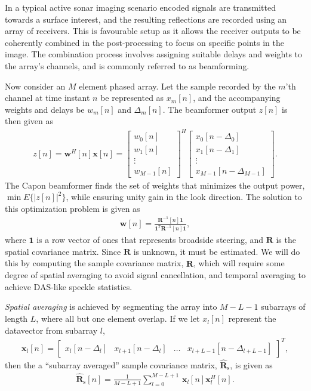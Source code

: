 \documentclass[10pt,a4paper]{article}
\newcommand\bmat[1]{\begin{bmatrix}#1\end{bmatrix}}
\newcommand\sumb[2]{\sum\limits_{#1}^{#2}\,}
\newcommand\T{^{\scriptscriptstyle T}}
\renewcommand\H{^{\scriptscriptstyle H}}
\renewcommand\vec[1]{\boldsymbol{#1}}
\newcommand\mat[1]{\boldsymbol{#1}}
\newcommand\1{\vec 1}
\newcommand*\w{\vec w}
\newcommand*\x{\vec x}
\newcommand*\R{\mat R}
\newcommand*\Ri{\R^{-1}}
\newcommand*\eR{\mat{\hat R}}
\renewcommand\gls[1]{#1}
\begin{document}
In a typical active sonar imaging scenario encoded signals are transmitted towards a surface interest, and the resulting reflections are recorded using an array of receivers. This is favourable setup as it allows the receiver outputs to be coherently combined in the post-processing to focus on specific points in the image. The combination process involves assigning suitable delays and weights to the array's channels, and is commonly referred to as beamforming.

Now consider an $M$ element phased array. Let the sample recorded by the $m$'th channel at time instant $n$ be represented as $x_m[n]$, and the accompanying weights and delays be  $w_m[n]$ and $\Delta_m[n]$. The beamformer output $z[n]$ is then given as
\begin{align}
z[n] = \w\H[n]\x[n] = \bmat{w_0[n]\\w_1[n]\\\vdots\\w_{M-1}[n]}^H \bmat{x_0[n-\Delta_0]\\x_1[n-\Delta_1]\\\vdots\\x_{M-1}[n-\Delta_{M-1}]}.\label{z}
\end{align}
The Capon beamformer \cite{Capon1969} finds the set of weights that minimizes the output power, $\min E\{|z[n]|^2\}$, while ensuring unity gain in the look direction. The solution to this optimization problem is given as
\begin{gather}
\vec w[n] = \frac{\Ri[n]\1}{\1\T\Ri[n]\1},\label{weights}
\end{gather}
where $\1$ is a row vector of ones that represents broadside steering, and $\R$ is the spatial covariance matrix. Since $\R$ is unknown, it must be estimated. We will do this by computing the sample covariance matrix, $\eR$, which will require some degree of spatial averaging to avoid signal cancellation, and temporal averaging to achieve \gls{DAS}-like speckle statistics.

\emph{Spatial averaging} is achieved by segmenting the array into $M-L-1$ subarrays of length $L$, where all but one element overlap. If we let $x_l[n]$ represent the datavector from subarray $l$,
\begin{gather}
\x_l[n] = \bmat{x_l[n-\Delta_l] & x_{l+1}[n-\Delta_l] & \dots & x_{l+L-1}[n-\Delta_{l+L-1}]}\T,
\end{gather}
then the a ``subarray averaged'' sample covariance matrix, $\eR_\text{s}$, is given as
\begin{gather}
\eR_\text{s}[n] = \frac{1}{M-L+1} \sumb{l=0}{M-L+1} \x_l[n]\x_l\H[n].\label{spatialR}
\end{gather}
\end{document}
